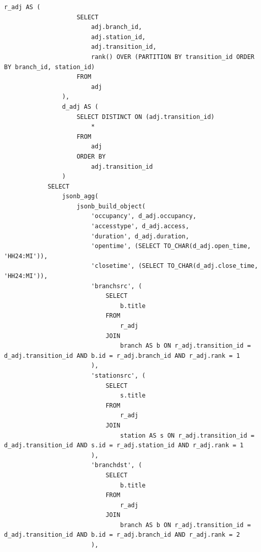 \clearpage

\begin{lstlisting}[label=lst:get_chart_json_by_id:3,caption=Реализация функции получения схемы (часть 3),firstnumber=103]
                r_adj AS (
                    SELECT
                        adj.branch_id,
                        adj.station_id,
                        adj.transition_id,
                        rank() OVER (PARTITION BY transition_id ORDER BY branch_id, station_id)
                    FROM
                        adj
                ),
                d_adj AS (
                    SELECT DISTINCT ON (adj.transition_id)
                        *
                    FROM
                        adj
                    ORDER BY
                        adj.transition_id
                )
            SELECT
                jsonb_agg(
                    jsonb_build_object(
                        'occupancy', d_adj.occupancy,
                        'accesstype', d_adj.access,
                        'duration', d_adj.duration,
                        'opentime', (SELECT TO_CHAR(d_adj.open_time, 'HH24:MI')),
                        'closetime', (SELECT TO_CHAR(d_adj.close_time, 'HH24:MI')),
                        'branchsrc', (
                            SELECT
                                b.title 
                            FROM
                                r_adj
                            JOIN
                                branch AS b ON r_adj.transition_id = d_adj.transition_id AND b.id = r_adj.branch_id AND r_adj.rank = 1
                        ),
                        'stationsrc', (
                            SELECT
                                s.title 
                            FROM
                                r_adj
                            JOIN
                                station AS s ON r_adj.transition_id = d_adj.transition_id AND s.id = r_adj.station_id AND r_adj.rank = 1
                        ),
                        'branchdst', (
                            SELECT
                                b.title 
                            FROM
                                r_adj
                            JOIN
                                branch AS b ON r_adj.transition_id = d_adj.transition_id AND b.id = r_adj.branch_id AND r_adj.rank = 2
                        ),
\end{lstlisting}

\clearpage

